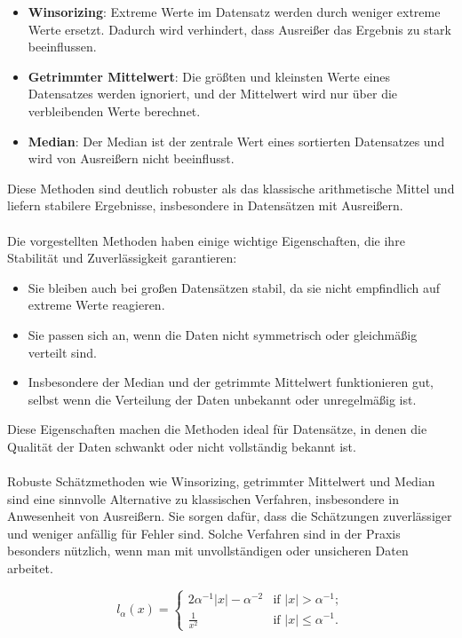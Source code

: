 \begin{itemize}
    \item \textbf{Winsorizing}: Extreme Werte im Datensatz werden durch weniger extreme Werte ersetzt. Dadurch wird verhindert, dass Ausreißer das Ergebnis zu stark beeinflussen.
    \item \textbf{Getrimmter Mittelwert}: Die größten und kleinsten Werte eines Datensatzes werden ignoriert, und der Mittelwert wird nur über die verbleibenden Werte berechnet.
    \item \textbf{Median}: Der Median ist der zentrale Wert eines sortierten Datensatzes und wird von Ausreißern nicht beeinflusst.
\end{itemize}
Diese Methoden sind deutlich robuster als das klassische arithmetische Mittel und liefern stabilere Ergebnisse, insbesondere in Datensätzen mit Ausreißern.
\\\\
Die vorgestellten Methoden haben einige wichtige Eigenschaften, die ihre Stabilität und Zuverlässigkeit garantieren:
\begin{itemize}
    \item Sie bleiben auch bei großen Datensätzen stabil, da sie nicht empfindlich auf extreme Werte reagieren.
    \item Sie passen sich an, wenn die Daten nicht symmetrisch oder gleichmäßig verteilt sind.
    \item Insbesondere der Median und der getrimmte Mittelwert funktionieren gut, selbst wenn die Verteilung der Daten unbekannt oder unregelmäßig ist.
\end{itemize}
Diese Eigenschaften machen die Methoden ideal für Datensätze, in denen die Qualität der Daten schwankt oder nicht vollständig bekannt ist.
\\\\
Robuste Schätzmethoden wie Winsorizing, getrimmter Mittelwert und Median sind eine sinnvolle Alternative zu klassischen Verfahren, insbesondere in Anwesenheit von Ausreißern. Sie sorgen dafür, dass die Schätzungen zuverlässiger und weniger anfällig für Fehler sind. Solche Verfahren sind in der Praxis besonders nützlich, wenn man mit unvollständigen oder unsicheren Daten arbeitet.


\begin{equation}
l_\alpha(x) = 
\begin{cases} 
2\alpha^{-1}|x| - \alpha^{-2} & \text{if } |x| > \alpha^{-1}; \\ 
\frac{1}{x^2} & \text{if } |x| \leq \alpha^{-1}. 
\end{cases}
\tag{3.3}
\label{eq:huber}
\end{equation}

